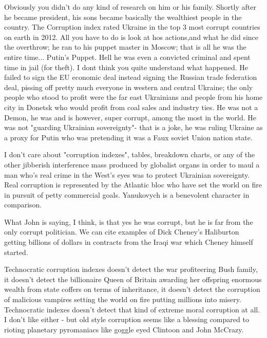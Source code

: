 \begin{itemize}
\begin{itemize}
Obviously you didn't do any kind of research on him or his family. Shortly
after he became president, his sons became basically the wealthiest people in
the country. The Corruption index rated Ukraine in the top 3 most corrupt
countries on earth in 2012. All you have to do is look at hos actions,and what
he did since the overthrow; he ran to his puppet master in Moscow; that is all
he was the entire time... Putin's Puppet. Hell he was even a convicted criminal
and spent time in jail (for theft). I dont think you quite understand what
happened. He failed to sign the EU economic deal instead signing the Russian
trade federation deal, pissing off pretty much everyone in western and central
Ukraine; the only people who stood to profit were the far east Ukrainians and
people from his home city in Donetsk who would profit from coal sales and
industry ties. He was not a Demon, he was and is however, super corrupt, among
the most in the world. He was not "guarding Ukrainian sovereignty"- that is a
joke, he was ruling Ukraine as a proxy for Putin who was pretending it was a
Faux soviet Union nation state.


I don't care about "corruption indexes", tables, breakdown charts, or any of
the other jibberish interference mass produced by globalist organs in order to
maul a man who's real crime in the West's eyes was to protect Ukrainian
sovereignty. Real corruption is represented by the Atlantic bloc who have set
the world on fire in pursuit of petty commercial goals. Yanukovych is a
benevolent character in comparison.


What John is saying, I think, is that yes he was corrupt, but he is far from
the only corrupt politician. We can cite examples of Dick Cheney's Haliburton
getting billions of dollars in contracts from the Iraqi war which Cheney
himself started.


Technocratic corruption indexes doesn't detect the war profiteering Bush
family, it doesn't detect the billionaire Queen of Britain awarding her
offspring enormous wealth from state coffers on terms of inheritance, it
doesn't detect the corruption of malicious vampires setting the world on fire
putting millions into misery. Technocratic indexes doesn't detect that kind of
extreme moral corruption at all. I don't like either - but old style corruption
seems like a blessing compared to rioting planetary pyromaniacs like goggle
eyed Clintoon and John McCrazy.


\end{itemize}
\end{itemize}
